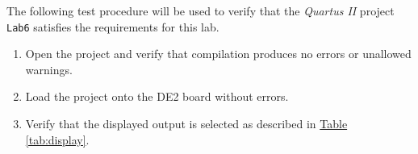The following test procedure will be used to verify that the \emph{Quartus II} project \verb|Lab6| satisfies the requirements for this lab.

\begin{enumerate}
    \item Open the project and verify that compilation produces no errors or unallowed warnings.
    \item Load the project onto the DE2 board without errors.
    \item Verify that the displayed output is selected as described in \hyperref[tab:display]{Table \ref*{tab:display}}.
\end{enumerate}


